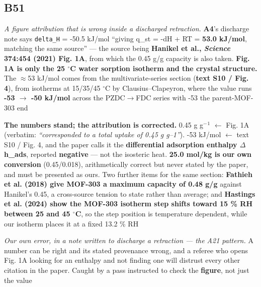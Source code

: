 \documentclass[10pt]{article}
\begin{document}
\subsection*{B51}\label{led:B51}
\begin{description}[leftmargin=0pt,itemsep=1pt]
\item[Defect.] \emph{A figure attribution that is wrong inside a discharged retraction.} \textbf{A4}'s discharge note says \texttt{delta\_H} = -50.5 kJ/mol ``giving q\_st = -dH + RT = \textbf{53.0 kJ/mol}, matching the same source'' --- the source being \textbf{Hanikel et al., \emph{Science} 374:454 (2021) Fig. 1A}, from which the 0.45 g/g capacity is also taken. \textbf{Fig. 1A is only the 25 $^\circ$C water sorption isotherm and the crystal structure.} The $\approx$53 kJ/mol comes from the multivariate-series section (\textbf{text S10 / Fig. 4}), from isotherms at 15/35/45 $^\circ$C by Clausius--Clapeyron, where the value runs \textbf{-53 $\rightarrow$ -50 kJ/mol} across the PZDC$\rightarrow$FDC series with -53 the parent-MOF-303 end
\item[Resolution.] \textbf{The numbers stand; the attribution is corrected.} 0.45 g g$^{-}$$^1$ $\leftarrow$ Fig. 1A (verbatim: \emph{``corresponded to a total uptake of 0.45 g g--1''}). -53 kJ/mol $\leftarrow$ text S10 / Fig. 4, and the paper calls it the \textbf{differential adsorption enthalpy $\Delta$h\_ads}, reported \textbf{negative} --- not the isosteric heat. \textbf{25.0 mol/kg is our own conversion} (0.45/0.018), arithmetically correct but never stated by the paper, and must be presented as ours. Two further items for the same section: \textbf{Fathieh et al. (2018) give MOF-303 a maximum capacity of 0.48 g/g} against Hanikel's 0.45, a cross-source tension to state rather than average; and \textbf{Hastings et al. (2024) show the MOF-303 isotherm step shifts toward 15 \% RH between 25 and 45 $^\circ$C}, so the step position is temperature dependent, while our isotherm places it at a fixed 13.2 \% RH
\item[Note.] \emph{Our own error, in a note written to discharge a retraction --- the A21 pattern.} A number can be right and its stated provenance wrong, and a referee who opens Fig. 1A looking for an enthalpy and not finding one will distrust every other citation in the paper. Caught by a pass instructed to check the \textbf{figure}, not just the value
\end{description}
\end{document}
